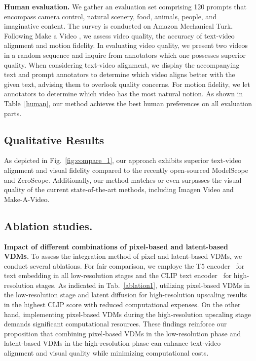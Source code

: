 \documentclass{article} \usepackage{iclr2024_conference,times}
\makeatletter
\let\oldfootnote\footnote
\def\footnote{\@ifstar\footnote@star\footnote@nostar}
\def\footnote@star#1{{\let\thefootnote\relax\footnotetext{#1}}}
\def\footnote@nostar{\oldfootnote}
\makeatother
\begin{document}
\noindent\textbf{Human evaluation.}
We gather an evaluation set comprising 120 prompts that encompass camera control, natural scenery, food, animals, people, and imaginative content. The survey is conducted on Amazon Mechanical Turk. Following Make a Video \citep{singer2022make}, we assess video quality, the accuracy of text-video alignment and motion fidelity. In evaluating video quality, we present two videos in a random sequence and inquire from annotators which one possesses superior quality. When considering text-video alignment, we display the accompanying text and prompt annotators to determine which video aligns better with the given text, advising them to overlook quality concerns. For motion fidelity, we let annotators to determine which video has the most natural notion. As shown in Table~\ref{human}, our method achieves the best human preferences on all evaluation parts.


\subsection{Qualitative Results}

As depicted in Fig.~\ref{fig:compare_1}, our approach exhibits superior text-video alignment and visual fidelity compared to the recently open-sourced ModelScope~\citep{wang2023modelscope} and ZeroScope\footnote{https://huggingface.co/cerspense/zeroscope-v2-576w}. Additionally, our method matches or even surpasses the visual quality of the current state-of-the-art methods, including Imagen Video and Make-A-Video. 





\vspace{-2mm}
\subsection{Ablation studies.}
\noindent\textbf{Impact of different combinations of pixel-based and latent-based VDMs.} To assess the integration method of pixel and latent-based VDMs, we conduct several ablations. For fair comparison, we employe the T5 encoder~\citep{2020t5} for text embedding in all low-resolution stages and the CLIP text encoder~\citep{clip} for high-resolution stages. As indicated in Tab.~\ref{ablation1}, utilizing pixel-based VDMs in the low-resolution stage and latent diffusion for high-resolution upscaling results in the highest CLIP score with reduced computational expenses. On the other hand, implementing pixel-based VDMs during the high-resolution upscaling stage demands significant computational resources. These findings reinforce our proposition that combining pixel-based VDMs in the low-resolution phase and latent-based VDMs in the high-resolution phase can enhance text-video alignment and visual quality while minimizing computational costs.
\end{document}
